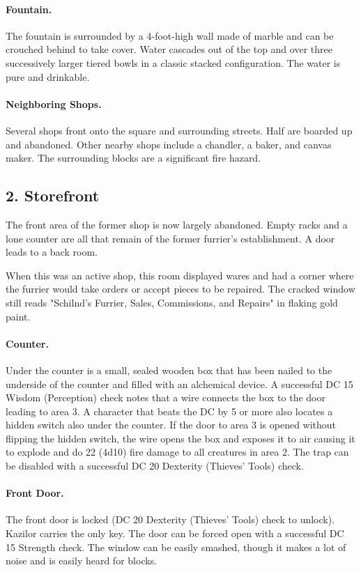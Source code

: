 \documentclass[10pt,a4paper,twoside,twocolumn,openany,bg=print,nodeprecatedcode]{dndbook}
\begin{document}
\paragraph{Fountain.}
The fountain is surrounded by a 4-foot-high wall made of marble and can be crouched behind to take cover. Water cascades out of the top and over three successively larger tiered bowls in a classic stacked configuration. The water is pure and drinkable.
\paragraph{Neighboring Shops.}
Several shops front onto the square and surrounding streets. Half are boarded up and abandoned. Other nearby shops include a chandler, a baker, and canvas maker. The surrounding blocks are a significant fire hazard.
\subsection{2. Storefront}
\begin{DndReadAloud}{}
The front area of the former shop is now largely abandoned. Empty racks and a lone counter are all that remain of the former furrier's establishment. A door leads to a back room.
\end{DndReadAloud}

When this was an active shop, this room displayed wares and had a corner where the furrier would take orders or accept pieces to be repaired. The cracked window still reads "Schilnd's Furrier, Sales, Commissions, and Repairs" in flaking gold paint.
\paragraph{Counter.}
Under the counter is a small, sealed wooden box that has been nailed to the underside of the counter and filled with an alchemical device. A successful DC 15 Wisdom (Perception) check notes that a wire connects the box to the door leading to area 3. A character that beats the DC by 5 or more also locates a hidden switch also under the counter. If the door to area 3 is opened without flipping the hidden switch, the wire opens the box and exposes it to air causing it to explode and do 22 (4d10) fire damage to all creatures in area 2. The trap can be disabled with a successful DC 20 Dexterity (Thieves' Tools) check.
\paragraph{Front Door.}
The front door is locked (DC 20 Dexterity (Thieves' Tools) check to unlock). Kazilor carries the only key. The door can be forced open with a successful DC 15 Strength check. The window can be easily smashed, though it makes a lot of noise and is easily heard for blocks.
\end{document}
